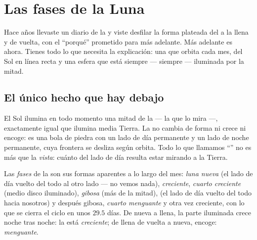 \chapter{Las fases de la Luna}\label{ch:g7:moon-phases}

Hace años llevaste un diario de la  y viste desfilar la forma
plateada del  a la llena y de vuelta, con el ``porqué''
prometido para más adelante. Más adelante es ahora. Tienes todo lo que
necesita la explicación: una  que orbita cada mes,  del
Sol en línea recta y una esfera que está siempre --- siempre ---
iluminada por la mitad.

\section{El único hecho que hay debajo}

\begin{proposition}\label{prop:g7:moon-phases:halflit}
El Sol ilumina en todo momento una mitad de la  --- la que
lo mira ---, exactamente igual que ilumina media Tierra. La
 no cambia de forma ni crece ni encoge: es una bola de piedra
con un lado de día permanente y un lado de noche permanente, cuya
frontera se desliza según orbita. Todo lo que llamamos
``'' no es más que la \emph{vista}: cuánto del lado de día
resulta estar mirando a la Tierra.
\end{proposition}

\begin{definition}\label{def:g7:moon-phases:phases}
Las \emph{fases} de la  son sus formas aparentes a
lo largo del mes: \emph{luna nueva} (el lado de día vuelto del todo al
otro lado --- no vemos nada), \emph{creciente}, \emph{cuarto
creciente} (medio disco iluminado), \emph{gibosa} (más de la mitad),
\emph{} (el lado de día vuelto del todo hacia nosotros) y
después gibosa, \emph{cuarto menguante} y otra vez creciente, con lo
que se cierra el ciclo en unos $29.5$ días. De nueva a llena, la parte
iluminada crece noche tras noche: la  está
\emph{creciente}; de llena de vuelta a nueva,
encoge: \emph{menguante}.
\end{definition}

